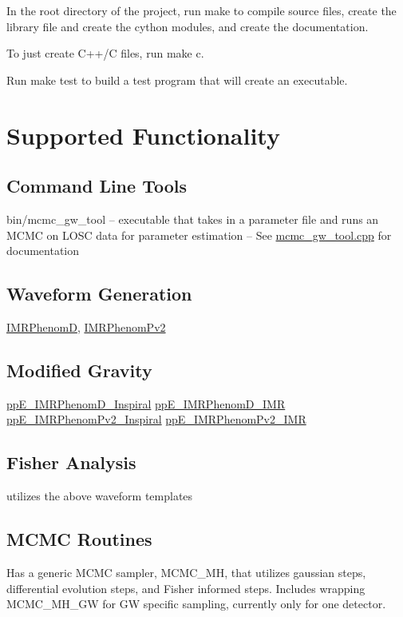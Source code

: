 In the root directory of the project, run \textquotesingle{}make\textquotesingle{} to compile source files, create the library file and create the cython modules, and create the documentation.

To just create C++/C files, run \textquotesingle{}make c\textquotesingle{}.

Run \textquotesingle{}make test\textquotesingle{} to build a test program that will create an executable.\hypertarget{index_functionality}{}\section{Supported Functionality}\label{index_functionality}
\hypertarget{index_cmdtools}{}\subsection{Command Line Tools}\label{index_cmdtools}
bin/mcmc\+\_\+gw\+\_\+tool -- executable that takes in a parameter file and runs an M\+C\+MC on L\+O\+SC data for parameter estimation -- See \hyperlink{mcmc__gw__tool_8cpp}{mcmc\+\_\+gw\+\_\+tool.\+cpp} for documentation\hypertarget{index_wave_gen}{}\subsection{Waveform Generation}\label{index_wave_gen}
\hyperlink{classIMRPhenomD}{I\+M\+R\+PhenomD}, \hyperlink{classIMRPhenomPv2}{I\+M\+R\+Phenom\+Pv2}\hypertarget{index_mod_grav}{}\subsection{Modified Gravity}\label{index_mod_grav}
\hyperlink{classppE__IMRPhenomD__Inspiral}{pp\+E\+\_\+\+I\+M\+R\+Phenom\+D\+\_\+\+Inspiral} \hyperlink{classppE__IMRPhenomD__IMR}{pp\+E\+\_\+\+I\+M\+R\+Phenom\+D\+\_\+\+I\+MR} \hyperlink{classppE__IMRPhenomPv2__Inspiral}{pp\+E\+\_\+\+I\+M\+R\+Phenom\+Pv2\+\_\+\+Inspiral} \hyperlink{classppE__IMRPhenomPv2__IMR}{pp\+E\+\_\+\+I\+M\+R\+Phenom\+Pv2\+\_\+\+I\+MR}\hypertarget{index_fisher}{}\subsection{Fisher Analysis}\label{index_fisher}
utilizes the above waveform templates\hypertarget{index_mcmc}{}\subsection{M\+C\+M\+C Routines}\label{index_mcmc}
Has a generic M\+C\+MC sampler, M\+C\+M\+C\+\_\+\+MH, that utilizes gaussian steps, differential evolution steps, and Fisher informed steps. Includes wrapping M\+C\+M\+C\+\_\+\+M\+H\+\_\+\+GW for GW specific sampling, currently only for one detector.

